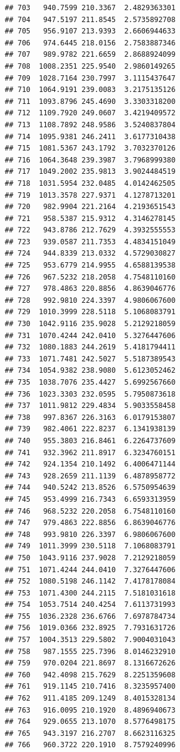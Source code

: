 \documentclass[
]{article}
\begin{document}
\begin{verbatim}
## 703   940.7599 210.3367  2.4829363301
## 704   947.5197 211.8545  2.5735892708
## 705   956.9107 213.9393  2.6606944633
## 706   974.6445 218.0156  2.7583887346
## 707   989.9782 221.6659  2.8688924099
## 708  1008.2351 225.9540  2.9860149265
## 709  1028.7164 230.7997  3.1115437647
## 710  1064.9191 239.0083  3.2175135126
## 711  1093.8796 245.4690  3.3303318200
## 712  1109.7920 249.0607  3.4219409572
## 713  1108.7892 248.9586  3.5240837804
## 714  1095.9381 246.2411  3.6177310438
## 715  1081.5367 243.1792  3.7032370126
## 716  1064.3648 239.3987  3.7968999380
## 717  1049.2002 235.9813  3.9024484519
## 718  1031.5954 232.0485  4.0142462505
## 719  1013.3578 227.9371  4.1278713201
## 720   982.9904 221.2164  4.2193651543
## 721   958.5387 215.9312  4.3146278145
## 722   943.8786 212.7629  4.3932555553
## 723   939.0587 211.7353  4.4834151049
## 724   944.8339 213.0332  4.5729030827
## 725   953.6779 214.9955  4.6588139538
## 726   967.5232 218.2058  4.7548110160
## 727   978.4863 220.8856  4.8639046776
## 728   992.9810 224.3397  4.9806067600
## 729  1010.3999 228.5118  5.1068083791
## 730  1042.9116 235.9028  5.2129218059
## 731  1070.4244 242.0410  5.3276447606
## 732  1080.1883 244.2619  5.4181794411
## 733  1071.7481 242.5027  5.5187389543
## 734  1054.9382 238.9080  5.6123052462
## 735  1038.7076 235.4427  5.6992567660
## 736  1023.3303 232.0595  5.7950873618
## 737  1011.9812 229.4834  5.9033558458
## 738   997.8367 226.3163  6.0179153807
## 739   982.4061 222.8237  6.1341938139
## 740   955.3803 216.8461  6.2264737609
## 741   932.3962 211.8917  6.3234760151
## 742   924.1354 210.1492  6.4006471144
## 743   928.2659 211.1139  6.4878958772
## 744   940.5242 213.8526  6.5750954639
## 745   953.4999 216.7343  6.6593313959
## 746   968.5232 220.2058  6.7548110160
## 747   979.4863 222.8856  6.8639046776
## 748   993.9810 226.3397  6.9806067600
## 749  1011.3999 230.5118  7.1068083791
## 750  1043.9116 237.9028  7.2129218059
## 751  1071.4244 244.0410  7.3276447606
## 752  1080.5198 246.1142  7.4178178084
## 753  1071.4300 244.2115  7.5181031618
## 754  1053.7514 240.4254  7.6113731993
## 755  1036.2328 236.6766  7.6978784734
## 756  1019.0366 232.8925  7.7931631726
## 757  1004.3513 229.5802  7.9004031043
## 758   987.1555 225.7396  8.0146232910
## 759   970.0204 221.8697  8.1316672626
## 760   942.4098 215.7629  8.2251359608
## 761   919.1145 210.7416  8.3235957400
## 762   911.4185 209.1249  8.4015328134
## 763   916.0095 210.1920  8.4896940673
## 764   929.0655 213.1070  8.5776498175
## 765   943.3197 216.2707  8.6623116325
## 766   960.3722 220.1910  8.7579240996

\end{verbatim}
\end{document}
